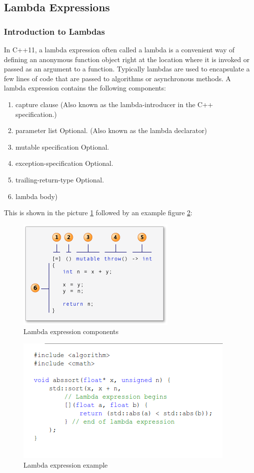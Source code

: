 \subsection{Lambda Expressions}
\subsubsection{Introduction to Lambdas}
In C++11, a lambda expression often called a lambda is a convenient way of defining an anonymous function object right at the location where it is invoked or passed as an argument to a function. Typically lambdas are used to encapsulate a few lines of code that are passed to algorithms or asynchronous methods. A lambda expression contains the following components:
\begin{enumerate}
	\item capture clause (Also known as the lambda-introducer in the C++ specification.)
	\item parameter list Optional. (Also known as the lambda declarator)
	\item mutable specification Optional.
	\item exception-specification Optional.
	\item trailing-return-type Optional.
	\item lambda body)
\end{enumerate}
This is shown in the picture \ref{fig:lambda_components} followed by an example figure \ref{fig:lambda_example}:
\begin{figure}[H]
	\centering
	\includegraphics{images/lambda_components.png}
	\caption{Lambda expression components}
	\label{fig:lambda_components}
\end{figure}
\begin{figure}[H]
	\centering
	\includegraphics{images/lambda_example.png}
	\caption{Lambda expression example}
	\label{fig:lambda_example}
\end{figure}
